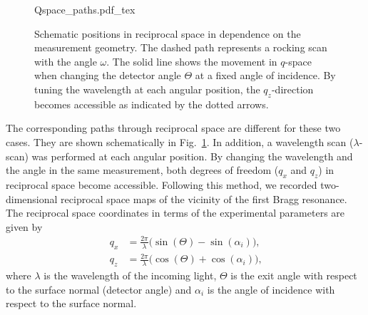 \begin{figure}[htb]
    \def\svgwidth{0.7\textwidth}
    {Qspace_paths.pdf_tex}
    \caption{Schematic positions in reciprocal space in dependence on the measurement geometry. The dashed path represents a rocking scan with the angle $\omega$. The solid line shows the movement in $q$-space when changing the detector angle $\Theta$ at a fixed angle of incidence. By tuning the wavelength at each angular position, the $q_z$-direction becomes accessible as indicated by the dotted arrows.} \label{fig:pathsInQ} 
\end{figure}
The corresponding paths through reciprocal space are different for these two cases. They are shown schematically in Fig.~\ref{fig:pathsInQ}. In addition, a wavelength scan ($\lambda$-scan) was performed at each angular position. By changing the wavelength and the angle in the same measurement, both degrees of freedom ($q_x$ and $q_z$) in reciprocal space become accessible. Following this method, we recorded two-dimensional reciprocal space maps of the vicinity of the first Bragg resonance. The reciprocal space coordinates in terms of the experimental parameters are given by 
\begin{align}
	q_x &= \frac{2 \pi}{\lambda} \big(\sin(\Theta) - \sin(\alpha_i)\big) \text{,}\\
	q_z &= \frac{2\pi}{\lambda} \big(\cos(\Theta) + \cos(\alpha_i)\big) \text{,} 
\end{align}
where $\lambda$ is the wavelength of the incoming light, $\Theta$ is the exit angle with respect to the surface normal (detector angle) and $\alpha_i$ is the angle of incidence with respect to the surface normal.

